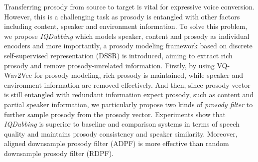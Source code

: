 \documentclass{article}
\begin{document}

Transferring prosody from source to target is vital for expressive voice conversion. However, this is a challenging task as prosody is entangled with other factors including content, speaker and environment information. To solve this problem, we propose \textit{IQDubbing} which models speaker, content and prosody as individual encoders and more importantly, a prosody modeling framework based on discrete self-supervised representation (DSSR) is introduced, aiming to extract rich prosody and remove prosody-unrelated information. Firstly, by using VQ-Wav2Vec for prosody modeling, rich prosody is maintained, while speaker and environment information are removed effectively. And then, since prosody vector is still entangled with redundant information expect prosody, such as content and partial speaker information, we particularly propose two kinds of \textit{prosody filter} to further sample prosody from the prosody vector.  Experiments show that \textit{IQDubbing} is superior to baseline and comparison systems in terms of speech quality and maintains prosody consistency and speaker similarity. Moreover, aligned downsample prosody filter (ADPF) is more effective than random downsample prosody filter (RDPF).

\vfill\pagebreak




\small
\end{document}
